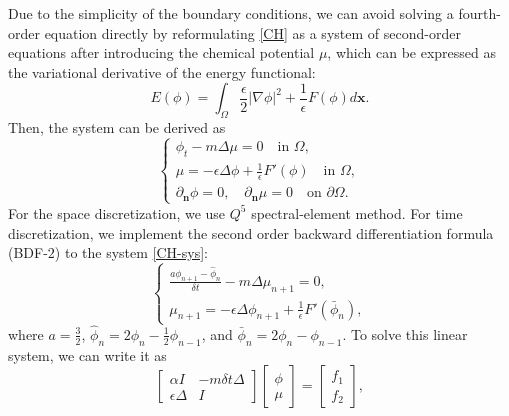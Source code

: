 \documentclass{article}
\begin{document}
Due to the simplicity of the boundary conditions, 
we can avoid solving a fourth-order equation directly by reformulating \eqref{CH} as a system of second-order equations after introducing the chemical potential $\mu$, which can be expressed as the variational derivative of the energy functional:
 \begin{equation}
 	E(\phi)=\int_{\Omega} \frac{\epsilon}{2}|\nabla \phi|^2+\frac{1}{\epsilon}F(\phi)d\bm{x}.
 \end{equation}
Then, the system can be derived as
\begin{equation}\label{CH-sys}
    \begin{cases}
        \phi_t - m\Delta \mu = 0\quad\text{in}\,\,\Omega,\\
        \mu = -\epsilon \Delta \phi + \frac{1}{\epsilon}F'(\phi)\quad\text{in}\,\,\Omega,\\
        \partial_{\bm{n}}\phi =0,\quad \partial_{\bm{n}}\mu = 0\quad\text{on}\,\,\partial\Omega.
    \end{cases}
\end{equation}
 For the space discretization, we use $Q^5$ spectral-element method. For time discretization, we implement the second order backward differentiation formula (BDF-$2$) to the system \eqref{CH-sys}:
\begin{equation}\label{BDF2}
    \begin{cases}
        \frac{a\phi_{n+1} - \hat{\phi}_{n}}{\delta t} - m\Delta \mu_{n+1} = 0,\\
        \mu_{n+1} = -\epsilon\Delta \phi_{n+1} + \frac{1}{\epsilon}F'(\bar{\phi}_{n}),
    \end{cases}
\end{equation}
where $a=\frac{3}{2}$, $\hat{\phi}_n = 2\phi_n - \frac{1}{2}\phi_{n-1}$, and $\bar{\phi}_n = 2\phi_n - \phi_{n-1}$.
To solve this linear system, we can write it as
\begin{equation}
    \begin{bmatrix}
        \alpha I & -m\delta t\Delta\\
        \epsilon\Delta & I
    \end{bmatrix}
    \begin{bmatrix}
        \phi\\
        \mu
    \end{bmatrix}
    =
    \begin{bmatrix}
        f_1\\
        f_2
    \end{bmatrix},
\end{equation}
\end{document}
